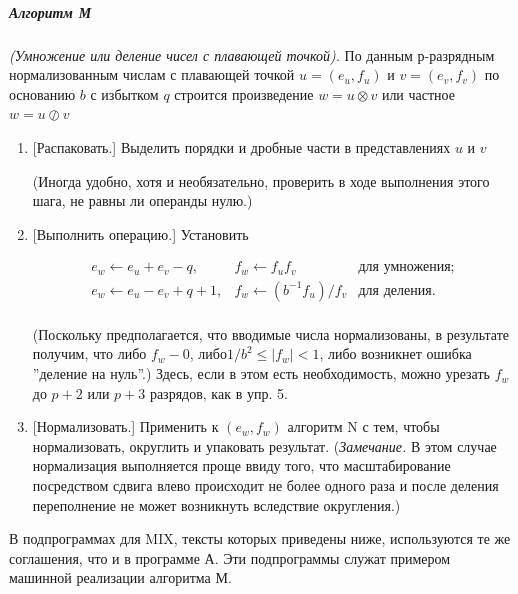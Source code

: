 \subparagraph{Алгоритм М} \textit{(Умножение или деление чисел с плавающей точкой).} По данным р-разрядным нормализованным числам с плавающей точкой $u = (e_u,f_u)$ и $v = (e_v, f_v)$ по основанию $b$ с избытком $q$ строится произведение $w = u \otimes v$ или частное
$w = u \oslash v$
\begin{enumerate}[label=M{\arabic*}]
\item\label{m1} [Распаковать.] Выделить порядки и дробные части в представлениях $u$ и $v$

\noindent(Иногда удобно, хотя и необязательно, проверить в ходе выполнения этого шага, не равны ли операнды нулю.)

\item\label{m2} [Выполнить операцию.] Установить

%

\begin{equation}\label{f9}
\begin{array}{lll} 
e_w \leftarrow e_u + e_v - q, & f_w \leftarrow f_u f_v &\text{для умножения;}\\ 
e_w \leftarrow e_u - e_v + q + 1, &f_w \leftarrow (b^{-1}f_u)/f_v &\text{для деления.}\\

\end{array} 
\end{equation}

(Поскольку предполагается, что вводимые числа нормализованы, в результате получим, что либо $f_w - 0$, $либо 1/b^2 \leq |f_w| < 1$, либо возникнет ошибка ''деление на нуль''.) Здесь, если в этом есть необходимость, можно урезать $f_w$ до $p + 2$ или $p + 3$ разрядов, как в упр. 5.

\item\label{m3} [Нормализовать.] Применить к $(e_w,f_w)$ алгоритм N с тем, чтобы нормализовать, округлить и упаковать результат. (\textit{Замечание.} В этом случае нормализация выполняется проще ввиду того, что масштабирование посредством сдвига влево происходит не более одного раза и после деления переполнение не может возникнуть вследствие округления.)
\end{enumerate}
В подпрограммах для MIX, тексты которых приведены ниже, используются те же соглашения, что и в программе А. Эти подпрограммы служат примером машинной реализации алгоритма М.


